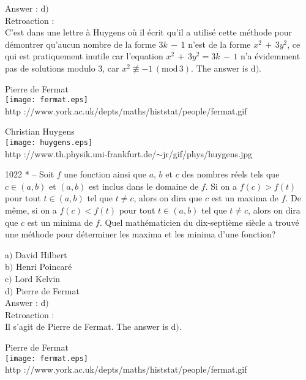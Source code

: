 ﻿\documentclass[letterpaper, 12pt]{article}
\begin{document}
Answer : d$)$\\

Retroaction : \\
C'est dans une lettre \`a Huygens o\`u il \'ecrit qu'il a utilis\'e
cette m\'ethode pour d\'emontrer qu'aucun nombre de la forme
$3k\,-\,1$ n'est de la forme $x^2\,+\,3y^2$, ce qui est pratiquement
inutile car l'equation $x^2\,+\,3y^2=3k\,-\,1$ n'a \'evidemment
pas de solutions modulo $3$, car $x^2\not
\equiv-1\,(\mathrm{mod}\,3)$.
The answer is d$)$.\\

        \begin{center}
        Pierre de Fermat\\
    \texttt{[image: fermat.eps]}\\
        {\footnotesize http
://www.york.ac.uk/depts/maths/histstat/people/fermat.gif}
    \end{center}

        \begin{center}
        Christian Huygens\\
    \texttt{[image: huygens.eps]}\\
        {\footnotesize http
://www.th.physik.uni-frankfurt.de/$\sim$jr/gif/phys/huygens.jpg}
    \end{center}

1022 * -- Soit $f$ une fonction ainsi que $a$, $b$ et $c$ des
nombres r\'eels tels que $c\in(a,b)$ et $(a,b)$ est inclus dans le
domaine de $f$. Si on a $f(c)>f(t)$ pour tout $t\in(a,b)$ tel que
$t\not=c$, alors on dira que $c$ est un maxima de $f$. De m\^eme, si
on a $f(c)<f(t)$ pour tout $t\in(a,b)$ tel que $t\not=c$, alors on
dira que $c$ est un minima de $f$. Quel math\'ematicien du
dix-septi\`eme si\`ecle a trouv\'e une m\'ethode pour d\'eterminer
les maxima et les minima d'une fonction?

a$)$ David Hilbert \\
b$)$ Henri Poincar\'e \\
c$)$ Lord Kelvin \\
d$)$ Pierre de Fermat \\

Answer : d$)$\\

Retroaction : \\
Il s'agit de Pierre de Fermat.
The answer is d$)$.\\

        \begin{center}
        Pierre de Fermat\\
    \texttt{[image: fermat.eps]}\\
        {\footnotesize http
://www.york.ac.uk/depts/maths/histstat/people/fermat.gif}
    \end{center}
\end{document}
